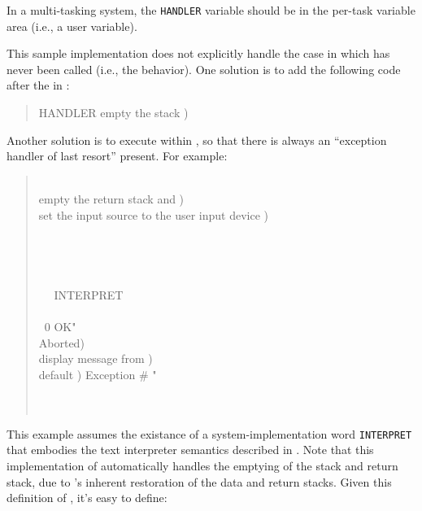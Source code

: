 \begin{info}
In a multi-tasking system, the \texttt{HANDLER} variable should be in
the per-task variable area (i.e., a user variable).

This sample implementation does not explicitly handle the case in
which  has never been called (i.e., the
 behavior). One solution is to add the following
code after the  in :
\begin{quote}\ttfamily
	HANDLER   
		 empty the stack ) 
\end{quote}
Another solution is to execute  within
, so that there is always an ``exception handler of last
resort'' present. For example:
\begin{quote}\ttfamily
	\word{:}  \\
	\tab {} empty the return stack and ) \\
	\tab {} set the input source to the user input device )\\
	\tab {} \word{[} \\
	\tab {} \\
	\tab~~  \\
	\tab {} \\
	\tab~~ \word{[']} INTERPRET ~ \\
	\tab~~  \\
	\tab\tab ~0     
		 OK"   ~ \\
	\tab{}   Aborted)  \\
	\tab{}   display message from  )  \\
	\tab\tab {} default )   Exception \# " ~  \\
	\tab~~  \\
	\tab {}  \\
	\word{;}
\end{quote}

This example assumes the existance of a system-implementation word
\texttt{INTERPRET} that embodies the text interpreter semantics
described in .
Note that this implementation of  automatically handles
the emptying of the stack and return stack, due to
's inherent restoration of the data and return
stacks. Given this definition of , it's easy to define:


\end{info}
